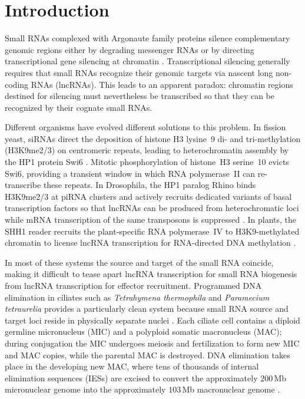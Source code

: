 \section{Introduction}

Small RNAs complexed with Argonaute family proteins silence complementary
genomic regions either by degrading messenger RNAs or by directing
transcriptional gene silencing at chromatin \citep{holoch2015rna,wilson2013rnai}.
Transcriptional silencing generally requires that small RNAs recognize their
genomic targets via nascent long non-coding RNAs (lncRNAs). This leads to an
apparent paradox: chromatin regions destined for silencing must nevertheless be
transcribed so that they can be recognized by their cognate small RNAs.

Different organisms have evolved different solutions to this problem. In
fission yeast, siRNAs direct the deposition of histone H3 lysine~9
di- and tri-methylation (H3K9me2/3) on centromeric repeats, leading to
heterochromatin assembly by the HP1 protein Swi6 \citep{volpe2002rnai,hall2002heterochromatin}.
Mitotic phosphorylation of histone~H3 serine~10 evicts Swi6, providing a
transient window in which RNA polymerase~II can re-transcribe these repeats.
In Drosophila, the HP1 paralog Rhino binds H3K9me2/3 at piRNA clusters
\citep{lethomas2014rhino} and actively recruits dedicated variants of basal
transcription factors so that lncRNAs can be produced from heterochromatic
loci while mRNA transcription of the same transposons is suppressed
\citep{andersen2017heterochromatin}. In plants, the SHH1 reader recruits the
plant-specific RNA polymerase~IV to H3K9-methylated chromatin to license
lncRNA transcription for RNA-directed DNA methylation \citep{law2013shh1}.

In most of these systems the source and target of the small RNA coincide,
making it difficult to tease apart lncRNA transcription for small RNA
biogenesis from lncRNA transcription for effector recruitment. Programmed DNA
elimination in ciliates such as \emph{Tetrahymena thermophila} and
\emph{Paramecium tetraurelia} provides a particularly clean system because
small RNA source and target loci reside in physically separate nuclei
\citep{chalker2011ciliate}. Each ciliate cell contains a diploid germline
micronucleus (MIC) and a polyploid somatic macronucleus (MAC); during
conjugation the MIC undergoes meiosis and fertilization to form new MIC and
MAC copies, while the parental MAC is destroyed. DNA elimination takes place
in the developing new MAC, where tens of thousands of internal elimination
sequences (IESs) are excised to convert the approximately $200$\,Mb
micronuclear genome into the approximately $103$\,Mb macronuclear genome
\citep{cheng2010transposase,dubois2017piggymac}.


